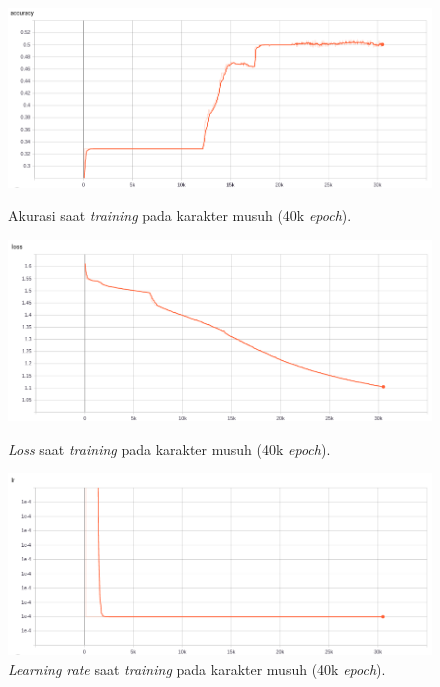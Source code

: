 \begin{figure} [!h] \centering
	\includegraphics[scale=0.44]{img/enemy_acc_40k_chap4.png}
	\caption{Akurasi saat \textit{training} pada karakter musuh (40k \textit{epoch}).}
	\label{fig:nn_enemy_acc_40k_chap4}
	\vspace{4ex}
	
	\includegraphics[scale=0.44]{img/enemy_loss_40k_chap4.png}
	\caption{\textit{Loss} saat \textit{training} pada karakter musuh (40k \textit{epoch}).}
	\label{fig:nn_enemy_loss_40k_chap4}
	\vspace{4ex}
	
	\includegraphics[scale=0.44]{img/enemy_lr_40k_chap4.png}
	\caption{\textit{Learning rate} saat \textit{training} pada karakter musuh (40k \textit{epoch}).}
	\label{fig:nn_enemy_lr_40k_chap4}
\end{figure}
\clearpage

